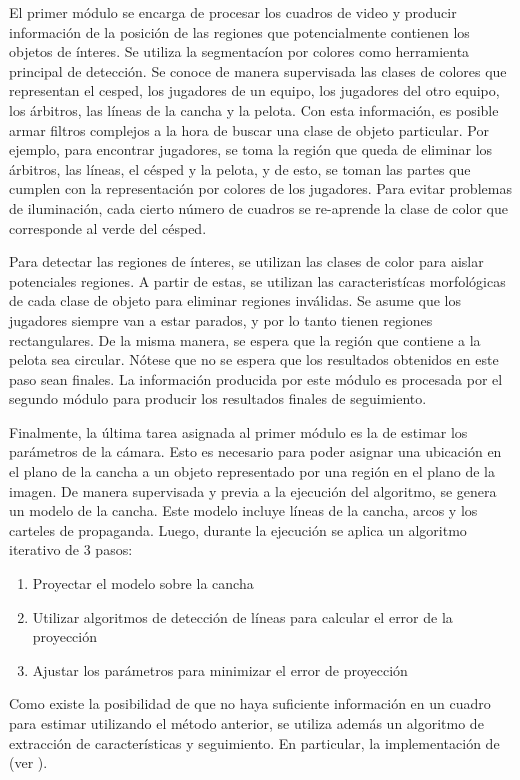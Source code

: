 El primer módulo se encarga de procesar los cuadros de video y producir información
de la posición de las regiones que potencialmente contienen los objetos de ínteres.
Se utiliza la segmentacíon por colores como herramienta principal de detección.
Se conoce de manera supervisada las clases de colores que representan el cesped, los jugadores de un equipo,
los jugadores del otro equipo, los árbitros, las líneas de la cancha y la pelota.
Con esta información, es posible armar filtros complejos a la hora de buscar una clase de objeto particular.
Por ejemplo, para encontrar jugadores, se toma la región que queda de
eliminar los árbitros, las líneas, el césped y la pelota,
y de esto, se toman las partes que cumplen con la representación por colores de los jugadores.
Para evitar problemas de iluminación, cada cierto número de cuadros se re-aprende la clase de color
que corresponde al verde del césped.

Para detectar las regiones de ínteres, se utilizan las clases de color para aislar potenciales regiones.
A partir de estas, se utilizan las caracteristícas morfológicas de cada clase de objeto para eliminar regiones
inválidas. Se asume que los jugadores siempre van a estar parados, y por lo tanto tienen regiones rectangulares.
De la misma manera, se espera que la región que contiene a la pelota sea circular.
Nótese que no se espera que los resultados obtenidos en este paso sean finales.
La información producida por este módulo es procesada por el segundo módulo para producir los resultados finales de
seguimiento.

Finalmente, la última tarea asignada al primer módulo es la de estimar los parámetros de la cámara.
Esto es necesario para poder asignar una ubicación en el plano de la cancha a un objeto representado
por una región en el plano de la imagen.
De manera supervisada y previa a la ejecución del algoritmo, se genera un modelo de la cancha.
Este modelo incluye líneas de la cancha, arcos y los carteles de propaganda.
Luego, durante la ejecución se aplica un algoritmo iterativo de 3 pasos:
\begin{enumerate}
\item Proyectar el modelo sobre la cancha
\item Utilizar algoritmos de detección de líneas para calcular el error de la proyección
\item Ajustar los parámetros para minimizar el error de proyección
\end{enumerate}

Como existe la posibilidad de que no haya suficiente información en un cuadro para estimar
utilizando el método anterior, se utiliza además un algoritmo de extracción de características y seguimiento.
En particular, la implementación de \citeauthor{shi-tomasi-tracking} (ver \cite{shi-tomasi-tracking}).

